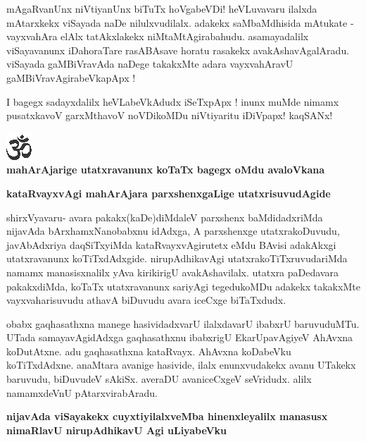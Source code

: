 \noindent
mAgaRvanUnx niVtiyanUnx biTuTx hoVgabeVDi! heVLuvavaru ilalxda mAtarxkekx viSayada naDe nilulxvu\-dilalx. adakekx saMbaMdhisida mAtukate - vayxvahAra elAlx tatAkxlakekx niMtaMtAgirabahudu. asamayadalilx viSayavanunx iDahoraTare rasABAsave horatu rasakekx avakAshavAgalAradu. viSayada gaMBiVravAda naDege takakxMte adara vayxvahAravU gaMBiVravAgirabeVkapApx !

I bagegx sadayxdalilx heVLabeVkAdudx iSeTxpApx ! inunx muMde nimamx pusatxkavoV garxMthavoV noVDikoMDu niVtiyaritu iDiVpapx! kaqSANx!

\bigskip

\begin{center}
\includegraphics{om.eps}\\[12pt]
{\Large\bf{mahArAjarige utatxravanunx koTaTx bagegx oMdu avaloVkana}}
\end{center}

{\bigskip
\noindent
{\large\bf kataRvayxvAgi mahArAjara parxshenxgaLige utatxrisuvudAgide}}
\medskip

\noindent
shirxVyavaru- avara pakakx(kaDe)diMdaleV parxshenx baMdidadxriMda nijavAda bArxhamxNa\break\-nobabxnu idAdxga, A parxshenxge utatxrakoDuvudu, javAbAdxriya daqSiTxyiMda kataRvayx\-vAgirutetx eMdu BAvisi adakAkxgi utatxra\-vanunx koTiTxdAdxgide. nirupAdhikavAgi utatxrakoTiTxruvudariMda namamx manasisxnalilx yAva kirikirigU ava\-kAsha\-vilalx. utatxra paDedavara pakakxdiMda, koTaTx utatxravanunx  sariyAgi tegedukoMDu adakekx takakxMte vayxva\-harisu\-vudu athavA biDuvudu avara iceCxge biTaTxdudx.

obabx gaqhasathxna manege hasividadxvarU ilalxdavarU ibabxrU baruvuduMTu. UTada samayavAgi\-dAdxga gaqhasathxnu ibabxrigU EkarUpavAgiyeV AhAvxna koDutAtxne. adu gaqhasathxna kataRvayx. AhAvxna koDa\-beVku koTiTxdAdxne. anaMtara avanige hasivide, ilalx enunxvudakekx avanu UTakekx baruvudu, biDu\-vudeV sAkiSx. averaDU avaniceCxgeV seVridudx. alilx namamxdeVnU pAtarxvirabAradu.

{\bigskip
\noindent
{\large\bf nijavAda viSayakekx cuyxtiyilalxveMba hinenxleyalilx manasusx nimaRlavU nirupAdhikavU Agi uLiya\-beVku}}\label{page250}
\medskip

